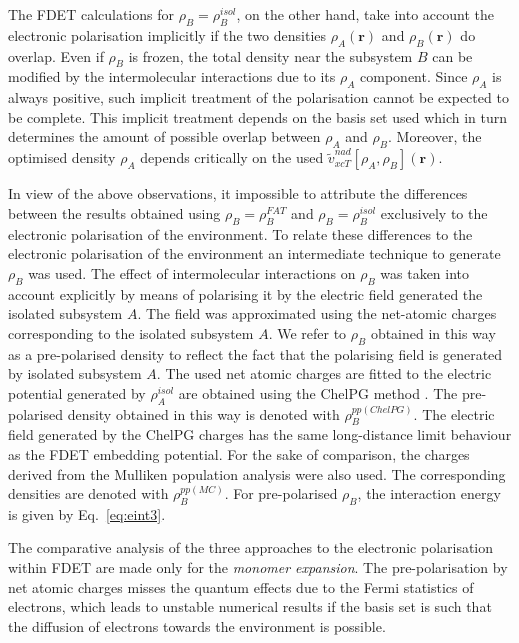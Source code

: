 \documentclass[amsmath,amssymb,preprint,aip,jcp]{revtex4-1}
\newcommand{\nr}[1]{\color{red}#1\color{black}}
\begin{document}
The FDET calculations for $\rho_B=\rho_B^{isol}$, on the other hand, take into account the electronic polarisation implicitly if the two densities $\rho_A(\mathbf{r})$ and $\rho_B(\mathbf{r})$ do overlap. 
Even if $\rho_B$ is frozen, the total density near the subsystem $B$ can be modified by the intermolecular interactions due to its $\rho_A$ component.  Since $\rho_A$
is always positive, such implicit treatment of the polarisation cannot be expected to be complete. 
This implicit treatment depends on the basis set \nr{used } which \nr{in turn } determines the amount of possible overlap between  $\rho_A$ and $\rho_B$.
Moreover, the optimised density 
$\rho_A$ depends critically on the used $\tilde{v}_{xcT}^{nad}[\rho_A,\rho_B](\mathbf{r})$.  

In view of the above observations, it impossible to attribute the differences between the results obtained using $\rho_B=\rho_B^{FAT}$ and  $\rho_B=\rho_B^{isol}$  exclusively to the electronic polarisation of the environment.
To relate these differences to the electronic polarisation of the environment an intermediate technique to generate 
 $\rho_B$ was used.
The effect of intermolecular interactions on 
$\rho_B$ was taken into account explicitly
 by means of polarising it by the electric field generated the isolated subsystem $A$. 
The field was approximated using the net-atomic charges corresponding to the isolated subsystem $A$.  
We refer to $\rho_B$ obtained in this way as a pre-polarised density to reflect the fact that the polarising field is generated by isolated subsystem $A$.
The used net atomic charges are fitted to the electric potential generated by $\rho_A^{isol}$  are obtained using the ChelPG method \cite{Breneman1990}.
The pre-polarised density obtained in this way is denoted with  $\rho_B^{pp(ChelPG)}$.
The electric field generated by the  ChelPG  charges has the same long-distance limit behaviour as the FDET embedding potential.
\nr{For the sake of comparison},  the charges derived from the Mulliken population analysis \cite{Mulliken1955} were also used.
The corresponding densities are denoted with  $\rho_B^{pp(MC)}$.  
For pre-polarised  $\rho_B$,  the interaction energy is given by Eq.~\ref{eq:eint3}.

The comparative analysis of the three approaches to the electronic polarisation within FDET
are made only for the {\it monomer expansion}. The pre-polarisation by net atomic charges misses the quantum effects due to the Fermi statistics of electrons, which leads to unstable numerical results if the basis set is such that the diffusion of electrons towards the environment is possible.\cite{Fradelos2011a,Fradelos2011c}
\end{document}
